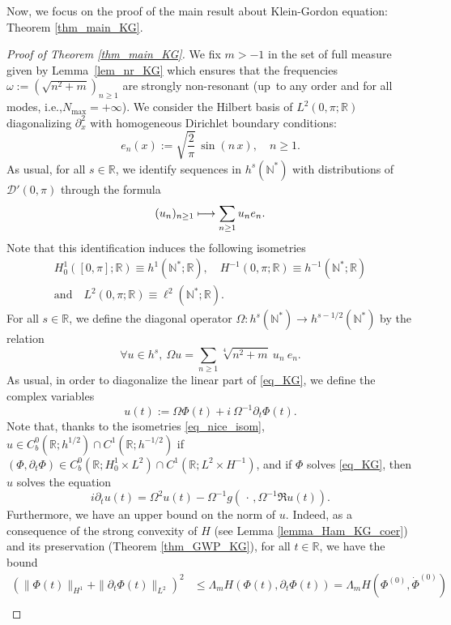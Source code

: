 \documentclass[11pt]{article}
\newcommand{\ie}{i.e.,\xspace}
\newcommand\mto{\mathchoice{\longmapsto}{\mapsto}{\mapsto}{\mapsto}}
\theoremstyle{definition}
\begin{document}
Now, we focus on the proof of the main result about Klein-Gordon equation: Theorem \ref{thm_main_KG}.
\begin{proof}[Proof of Theorem \ref{thm_main_KG}] We fix $m>-1$ in the set of full measure given by Lemma~\ref{lem_nr_KG} which ensures that the frequencies $\omega:=(\sqrt{n^2+m})_{n\geq 1}$ are strongly non-resonant (up~to any order and for all modes, \ie $N_{\max}=+\infty$). We consider the Hilbert basis of $L^2(0,\pi;\mathbb{R})$ diagonalizing $\partial_x^2$ with homogeneous Dirichlet boundary conditions:
\[
e_n(x):= \sqrt{\frac2\pi}\, \sin(n \, x), \quad n\geq 1.
\]
As usual, for all $s\in \mathbb{R}$, we identify sequences in $h^{s}(\mathbb{N}^*)$ with distributions of $\mathcal{D}'(0,\pi)$ through the formula
\[
(u_n)_{n\geq 1} \mto \sum_{n\geq 1} u_n e_n.
\]
Note that this identification induces the following isometries
\begin{multline}
\label{eq_nice_isom}
H^1_0([0,\pi];\mathbb{R}) \equiv h^1(\mathbb{N}^*;\mathbb{R}), \quad H^{-1}(0,\pi;\mathbb{R}) \equiv h^{-1}(\mathbb{N}^*;\mathbb{R})\\ \text{and} \quad L^{2}(0,\pi;\mathbb{R}) \equiv \ell^2(\mathbb{N}^*;\mathbb{R}).
\end{multline}
For all $s\in \mathbb{R}$, we define the diagonal operator $\Omega:h^s(\mathbb{N}^*) \to h^{s-1/2}(\mathbb{N}^*)$ by the relation
\[
\forall u\in h^s, \ \Omega u = \sum_{n\geq 1} \sqrt[4]{n^2+m} \ u_n \ e_n.
\]
As usual, in order to diagonalize the linear part of \eqref{eq_KG}, we define the complex variables
\[
u(t):= \Omega \Phi(t)+i \ \Omega^{-1} \partial_t \Phi(t).
\]
Note that, thanks to the isometries \eqref{eq_nice_isom}, $u \in C^0_b(\mathbb{R}; h^{1/2}) \cap C^1(\mathbb{R}; h^{-1/2})$ if $(\Phi,\partial_t \Phi) \in C^0_b(\mathbb{R}; H^1_0 \times L^2) \cap C^1(\mathbb{R}; L^2 \times H^{-1})$, and if $\Phi$ solves \eqref{eq_KG}, then $u$ solves the equation%
\begin{equation}
\label{eq_ca_commence_a_ressembler_a_qqch}
i\partial_t u(t) = \Omega^2 u(t) - \Omega^{-1} g(\, \cdot\,,\Omega^{-1} \Re u(t)).
\end{equation}
Furthermore, we have an upper bound on the norm of $u$. Indeed, as a consequence of the strong convexity of $H$ (see Lemma \ref{lemma_Ham_KG_coer}) and its preservation (Theorem \ref{thm_GWP_KG}), for all $t\in \mathbb{R}$, we have the bound
\begin{equation*}
\begin{split}
(\| \Phi(t) \|_{H^1} + \| \partial_t \Phi(t) \|_{L^2})^2 & \leq \Lambda_m H(\Phi(t),\partial_t \Phi(t)) = \Lambda_m H(\Phi^{(0)},\dot{\Phi}^{(0)}) \\

\end{split}
\end{equation*}
\end{proof}
\end{document}
